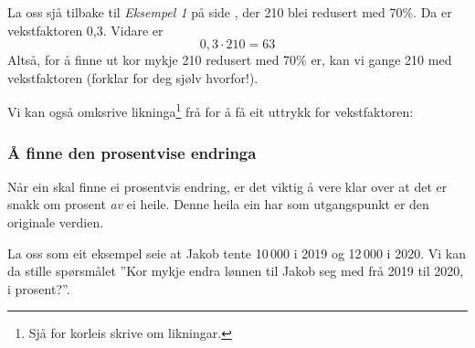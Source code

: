 La oss sjå tilbake til \textsl{Eksempel 1} på side \pageref{vekstfakteks}, der 210 blei redusert med 70\%. Da er vekstfaktoren 0,3. Vidare er
\[ 0,3\cdot210=63 \]
Altså, for å finne ut kor mykje 210 redusert med 70\% er, kan vi gange 210 med vekstfaktoren (forklar for deg sjølv hvorfor!). \regv


\newpage
{} \vsk
Vi kan også omksrive likninga\footnote{Sjå  for korleis skrive om likningar.} frå  for å få eit uttrykk for vekstfaktoren: \regv

\subsubsection{Å finne den prosentvise endringa}
Når ein skal finne ei prosentvis endring, er det viktig å vere klar over at det er snakk om prosent \textsl{av} ei heile. Denne heila ein har som utgangspunkt er den originale verdien. \vsk

La oss som eit eksempel seie at Jakob tente 10\,000 i 2019 og 12\,000 i 2020. Vi kan da stille spørsmålet ''Kor mykje endra lønnen til Jakob seg med frå 2019 til 2020, i prosent?''. \vsk

